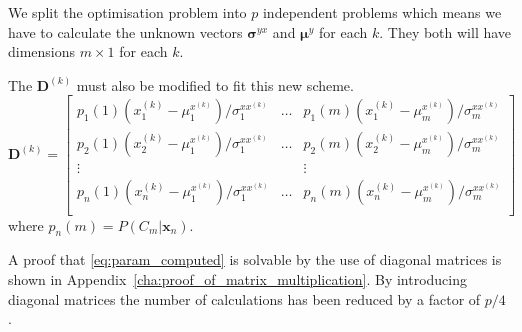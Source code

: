 We split the optimisation problem into $p$ independent problems which means we have to calculate the unknown vectors $\boldsymbol{\sigma}^{yx}$ and $\boldsymbol{\mu}^{y}$ for each $k$. They both will have dimensions $m\times 1$ for each $k$.

The $\mathbf{D}^{(k)}$ must also be modified to fit this new scheme.
\begin{equation}
	\label{eq:D_matrix_new}
	\mathbf{D}^{(k)} = \begin{bmatrix}
		p_1(1)(x_1^{(k)} - \mu_1^{x^{(k)}})/\sigma_1^{xx^{(k)}} & \dots & p_1(m)(x_1^{(k)} - \mu_m^{x^{(k)}})/\sigma_m^{xx^{(k)}} \\
		p_2(1)(x_2^{(k)} - \mu_1^{x^{(k)}})/\sigma_1^{xx^{(k)}} & \dots & p_2(m)(x_2^{(k)} - \mu_m^{x^{(k)}})/\sigma_m^{xx^{(k)}} \\
		\vdots & & \vdots \\
		p_n(1)(x_n^{(k)} - \mu_1^{x^{(k)}})/\sigma_1^{xx^{(k)}} & \dots & p_n(m)(x_n^{(k)} - \mu_m^{x^{(k)}})/\sigma_m^{xx^{(k)}} \\
	\end{bmatrix}
\end{equation}
where $p_n(m)=P(C_m\vert \mathbf{x}_n)$.

A proof that \eqref{eq:param_computed} is solvable by the use of diagonal matrices is shown in Appendix~\ref{cha:proof_of_matrix_multiplication}. By introducing diagonal matrices the number of calculations has been reduced by a factor of $p/4$ \cite{stylianou98}.
